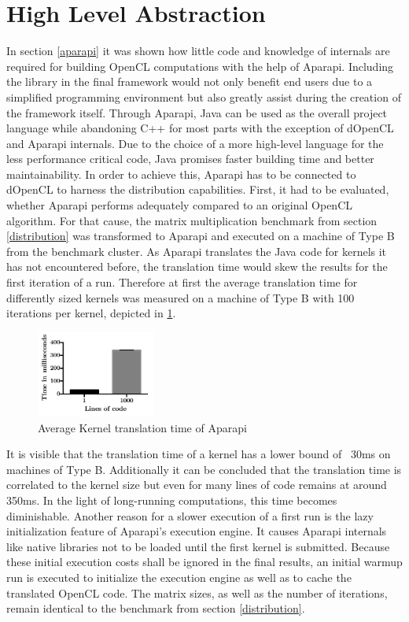 \section{High Level Abstraction}
\label{abstraction}

In section \ref{aparapi} it was shown how little code and knowledge of internals are required for building OpenCL computations with the help of Aparapi. Including the library in the final framework would not only benefit end users due to a simplified programming environment but also greatly assist during the creation of the framework itself. Through Aparapi, Java can be used as the overall project language while abandoning C++ for most parts with the exception of dOpenCL and Aparapi internals. Due to the choice of a more high-level language for the less performance critical code, Java promises faster building time and better maintainability. In order to achieve this, Aparapi has to be connected to dOpenCL to harness the distribution capabilities. First, it had to be evaluated, whether Aparapi performs adequately compared to an original OpenCL algorithm. For that cause, the matrix multiplication benchmark from section \ref{distribution} was transformed to Aparapi and executed on a machine of Type B from the benchmark cluster. As Aparapi translates the Java code for kernels it has not encountered before, the translation time would skew the results for the first iteration of a run. Therefore at first the average translation time for differently sized kernels was measured on a machine of Type B with 100 iterations per kernel, depicted in \ref{img:aparapi_translation}.

\begin{figure}[!htb]
	\includegraphics[width=0.35\textwidth]{images/aparapi_translation.pdf}
	\centering
	\caption{Average Kernel translation time of Aparapi}
	\label{img:aparapi_translation}
\end{figure}

It is visible that the translation time of a kernel has a lower bound of ~30ms on machines of Type B. Additionally it can be concluded that the translation time is correlated to the kernel size but even for many lines of code remains at around 350ms. In the light of long-running computations, this time becomes diminishable. Another reason for a slower execution of a first run is the lazy initialization feature of Aparapi's execution engine. It causes Aparapi internals like native libraries not to be loaded until the first kernel is submitted. Because these initial execution costs shall be ignored in the final results, an initial warmup run is executed to initialize the execution engine as well as to cache the translated OpenCL code. The matrix sizes, as well as the number of iterations, remain identical to the benchmark from section \ref{distribution}.

